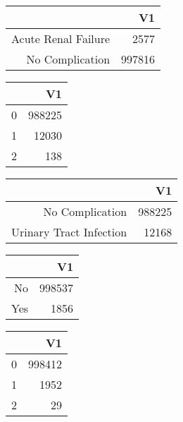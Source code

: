 \bigskip\bigskip
\centering
\begin{tabular}{rr}
  \hline
 & V1 \\ 
  \hline
Acute Renal Failure & 2577 \\ 
  No Complication & 997816 \\ 
   \hline
\end{tabular}

\bigskip\bigskip
\centering
\begin{tabular}{rr}
  \hline
 & V1 \\ 
  \hline
0 & 988225 \\ 
  1 & 12030 \\ 
  2 & 138 \\ 
   \hline
\end{tabular}

\bigskip\bigskip
\centering
\begin{tabular}{rr}
  \hline
 & V1 \\ 
  \hline
No Complication & 988225 \\ 
  Urinary Tract Infection & 12168 \\ 
   \hline
\end{tabular}

\bigskip\bigskip
\centering
\begin{tabular}{rr}
  \hline
 & V1 \\ 
  \hline
No & 998537 \\ 
  Yes & 1856 \\ 
   \hline
\end{tabular}

\bigskip\bigskip
\centering
\begin{tabular}{rr}
  \hline
 & V1 \\ 
  \hline
0 & 998412 \\ 
  1 & 1952 \\ 
  2 &  29 \\ 
   \hline
\end{tabular}

